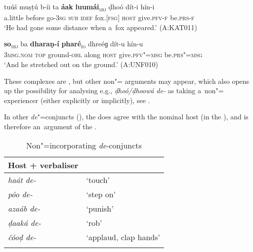 \begin{exe}
\ex
\label{ex:12-92}
\gll tuúš muṣṭú b-íi ta {\ob}\textbf{áak} \textbf{luumái}{\cb}\textsubscript{\textsc{\upshape sbj}} ḍhoó dít-i hín-i\\
a.little before go-\textsc{3sg} \textsc{sub} \textsc{idef} fox.[\textsc{fsg]} \textsc{host} give.\textsc{pfv-f} be.\textsc{prs-f}\\
\glt `He had gone some distance when a~fox appeared.' (A:KAT011)
\end{exe}
\begin{exe}
\ex
\label{ex:12-93}
\gll {\ob}\textbf{so}{\cb}\textsubscript{\textsc{\upshape sbj}} ba {\ob}\textbf{dharaṇ-í} \textbf{pharé}{\cb}\textsubscript{\textsc{\upshape io}} dhreéɡ dít-u hín-u\\
\textsc{3msg.nom} \textsc{top} ground-\textsc{obl} along \textsc{host} give.\textsc{pfv"=msg} be.\textsc{prs"=msg}\\
\glt `And he stretched out on the ground.' (A:UNF010)
\end{exe}

These complexes are , but other non"= arguments may appear, which also opens up the possibility for analysing e.g., \textit{ḍhoó/ḍhoowá de-} as taking a~non"= experiencer  (either explicitly or implicitly), see . 


 In other \textit{de}"=conjuncts (), the  does agree with the nominal host (in the ), and is therefore an~argument of the . 


\begin{table}[ht]
\caption{Non"=incorporating \textit{de}-conjuncts}
\begin{tabularx}{.75\textwidth}{ l@{\hspace{45pt}} Q }
\lspbottomrule
\textbf{Host + verbaliser} &
\\\midrule
\textit{haát de-} &
`touch'\\
\textit{póo de-} &
`step on'\\
\textit{azaáb de-} &
`punish'\\
\textit{ḍaaká de-} &
`rob'\\
\textit{čóoḍ de-} &
`applaud, clap hands'\\\lspbottomrule
\end{tabularx}
\label{tab:12-8}
\end{table}


